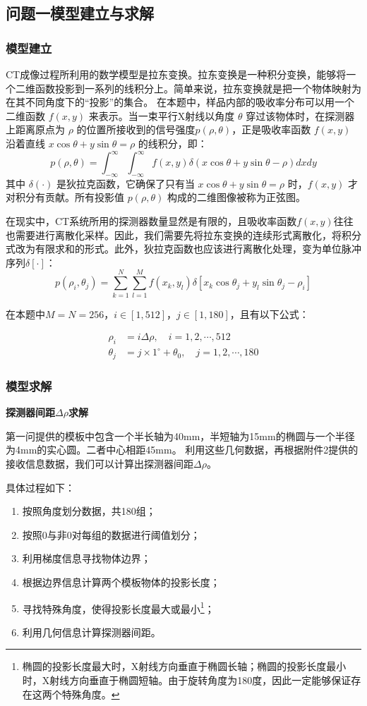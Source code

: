 \subsection{问题一模型建立与求解}
\subsubsection{模型建立}
CT成像过程所利用的数学模型是拉东变换。拉东变换是一种积分变换，能够将一个二维函数投影到一系列的线积分上。简单来说，拉东变换就是把一个物体映射为在其不同角度下的“投影”的集合。
在本题中，样品内部的吸收率分布可以用一个二维函数 $f(x,y)$ 来表示。当一束平行X射线以角度 $\theta$ 穿过该物体时，在探测器上距离原点为 $\rho$ 的位置所接收到的信号强度$p(\rho,\theta)$，正是吸收率函数 $f(x,y)$ 沿着直线 $x\cos\theta+y\sin\theta=\rho$ 的线积分，即：
$$p(\rho,\theta)=\int_{-\infty}^{\infty}\int_{-\infty}^{\infty}f(x,y)\delta(x\cos\theta+y\sin\theta-\rho)dxdy$$
其中 $\delta(\cdot)$ 是狄拉克函数，它确保了只有当 $x\cos\theta+y\sin\theta=\rho$ 时，$f(x,y)$ 才对积分有贡献。所有投影值 $p(\rho,\theta)$ 构成的二维图像被称为正弦图。

在现实中，CT系统所用的探测器数量显然是有限的，且吸收率函数$f(x,y)$往往也需要进行离散化采样。因此，我们需要先将拉东变换的连续形式离散化，将积分式改为有限求和的形式。此外，狄拉克函数也应该进行离散化处理，变为单位脉冲序列$\delta[\cdot]$：
$$p(\rho_i,\theta_j)=\sum_{k=1}^{N}\sum_{l=1}^{M}f(x_k,y_l)\delta[x_k\cos\theta_j+y_l\sin\theta_j-\rho_i]$$

在本题中$M=N=256$，$i \in [1,512]$，$j \in [1,180]$，且有以下公式：

\begin{equation*}
    \begin{aligned}
        \rho_i &= i\Delta\rho, \quad i=1,2,\cdots,512 \\
        \theta_j &= j\times 1^\circ+\theta_0, \quad j=1,2,\cdots,180
    \end{aligned}
\end{equation*}

\subsubsection{模型求解}
\textbf{探测器间距$\Delta\rho$求解}
\par
第一问提供的模板中包含一个半长轴为40mm，半短轴为15mm的椭圆与一个半径为4mm的实心圆。二者中心相距45mm。
利用这些几何数据，再根据附件2提供的接收信息数据，我们可以计算出探测器间距$\Delta\rho$。\par
具体过程如下：
\begin{enumerate}
    \item 按照角度划分数据，共180组；
    \item 按照0与非0对每组的数据进行阈值划分；
    \item 利用梯度信息寻找物体边界；
    \item 根据边界信息计算两个模板物体的投影长度；
    \item 寻找特殊角度，使得投影长度最大或最小\footnote{椭圆的投影长度最大时，X射线方向垂直于椭圆长轴；椭圆的投影长度最小时，X射线方向垂直于椭圆短轴。由于旋转角度为180度，因此一定能够保证存在这两个特殊角度。}；
    \item 利用几何信息计算探测器间距。
\end{enumerate}


